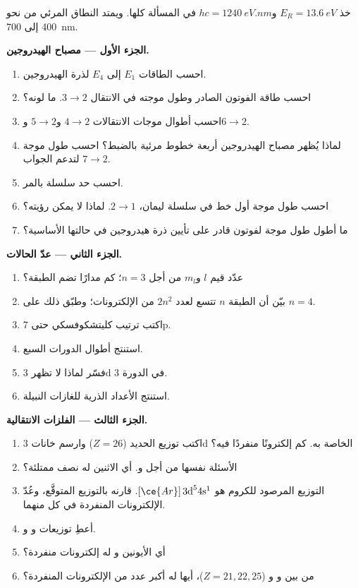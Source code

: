 \begin{problem}
\label{pb:b1:quantum-numbers:1}
خذ $E_R = \qty{13.6}{eV}$ و$hc = \qty{1240}{eV.nm}$ في المسألة كلها.
ويمتد النطاق المرئي من نحو 400 إلى \qty{700}{nm}.

\medskip
\noindent\textbf{الجزء الأول --- مصباح الهيدروجين.}
\begin{enumerate}
  \item احسب الطاقات $E_1$ إلى $E_4$ لذرة الهيدروجين.
  \item احسب طاقة الفوتون الصادر وطول موجته في
        الانتقال $3 \to 2$. ما لونه؟
  \item احسب أطوال موجات الانتقالات $4 \to 2$ و$5 \to 2$
        و$6 \to 2$.
  \item لماذا يُظهر مصباح الهيدروجين أربعة خطوط مرئية بالضبط؟
        احسب طول موجة $7 \to 2$ لتدعم الجواب.
  \item احسب حد سلسلة بالمر.
  \item احسب طول موجة أول خط في سلسلة ليمان، $2 \to 1$. لماذا لا
        يمكن رؤيته؟
  \item ما أطول طول موجة لفوتون قادر على تأيين ذرة
        هيدروجين في حالتها الأساسية؟
\end{enumerate}

\medskip
\noindent\textbf{الجزء الثاني --- عدّ الحالات.}
\begin{enumerate}[resume]
  \item عدّد قيم $l$ و$m_l$ من أجل $n = 3$؛ كم مدارًا
        تضم الطبقة؟
  \item بيّن أن الطبقة $n$ تتسع لعدد $2n^2$ من الإلكترونات؛ وطبّق ذلك على $n = 4$.
  \item اكتب ترتيب كليتشكوفسكي حتى 7p.
  \item استنتج أطوال الدورات السبع.
  \item فسّر لماذا لا تظهر  3d في الدورة 3.
  \item استنتج الأعداد الذرية للغازات النبيلة.
\end{enumerate}

\medskip
\noindent\textbf{الجزء الثالث --- الفلزات الانتقالية.}
\begin{enumerate}[resume]
  \item اكتب توزيع الحديد ($Z = 26$) وارسم خانات 3d
        الخاصة به. كم إلكترونًا منفردًا فيه؟
  \item الأسئلة نفسها من أجل  و. أي الاثنين
        له  نصف ممتلئة؟
  \item التوزيع المرصود للكروم هو $[\ce{Ar}]\,3\text{d}^5
        4\text{s}^1$. قارنه بالتوزيع المتوقَّع، وعُدّ الإلكترونات
        المنفردة في كل منهما.
  \item أعطِ توزيعات  و و.
  \item أي الأيونين  و له إلكترونات منفردة؟
  \item من بين  و و ($Z = 21, 22, 25$)،
        أيها له أكبر عدد من الإلكترونات المنفردة؟
\end{enumerate}


\end{problem}
